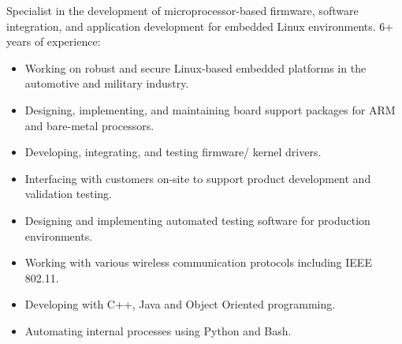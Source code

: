 

\begin{cvparagraph}


Specialist in the development of microprocessor-based firmware, software integration, and application development for embedded Linux environments.  6+ years of experience:\\

\begin{itemize}
  \item Working on robust and secure Linux-based embedded platforms in the automotive and military industry.
  \item Designing, implementing, and maintaining board support packages for ARM and bare-metal processors.
  \item Developing, integrating, and testing firmware/ kernel drivers. 
  \item Interfacing with customers on-site to support product development and validation testing.
  \item Designing and implementing automated testing software for production environments.  
  \item Working with various wireless communication protocols including IEEE 802.11. 
  \item Developing with C++, Java and Object Oriented programming.
  \item Automating internal processes using Python and Bash.
\end{itemize}




\end{cvparagraph}
